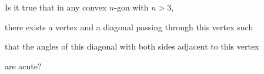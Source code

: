 Is it true that in any convex $n$-gon with $n > 3$, 

 there exists a vertex and a diagonal passing through this vertex such 

that the angles of this diagonal with both sides adjacent to this vertex

 are acute?